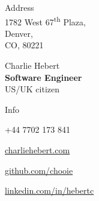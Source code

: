\noindent
\begin{minipage}[t]{0.333\textwidth}  
  {\huge Address}\\
  1782 West 67\textsuperscript{th} Plaza,\\
  Denver,\\
  CO, 80221\\
\end{minipage}
\noindent
\begin{minipage}[t]{0.333\textwidth}
  \begin{center}
    {\Huge Charlie Hebert}\\
    \textbf{Software Engineer}\\
    US/UK citizen\\
  \end{center}
\end{minipage}
\noindent\begin{minipage}[t]{0.333\textwidth}
  \begin{flushright}
    {\huge Info}\\
  \end{flushright}

  \begin{description}
    \raggedleft
    \item[Mob] +44 7702 173 841
    \item[Web] \href{http://www.charliehebert.com}{charliehebert.com}
    \item[Github] \href{http://www.github.com/chooie}{github.com/chooie}
    \item[LinkedIn] \href{http://linkedin.com/in/hebertc}{linkedin.com/in/hebertc}
  \end{description}
\end{minipage}

